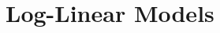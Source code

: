 \chapter{Log-Linear Models}

\begin{ex}
\end{ex}

\begin{ex}
\end{ex}

\begin{ex}
\end{ex}

\begin{ex}
\end{ex}

\begin{ex}
\end{ex}

\begin{ex}
\end{ex}
